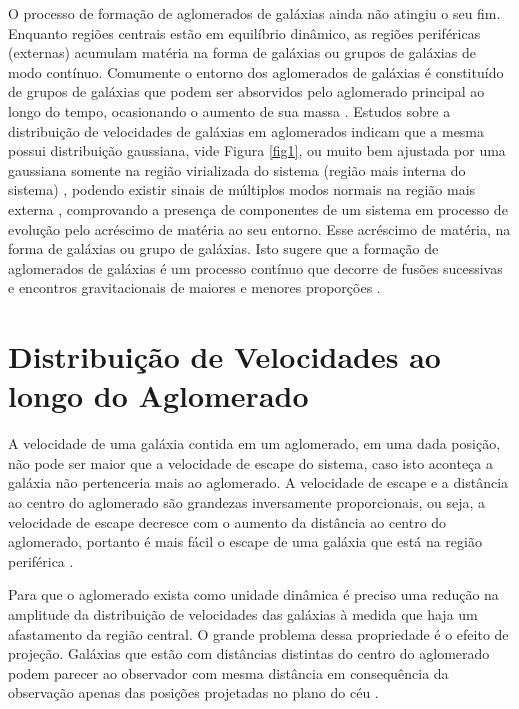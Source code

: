 O processo de formação de aglomerados de galáxias ainda não atingiu o seu fim. Enquanto regiões centrais estão em equilíbrio dinâmico, as regiões periféricas (externas) acumulam matéria na forma de galáxias ou grupos de galáxias de modo contínuo. Comumente o entorno dos aglomerados de galáxias é constituído de grupos de galáxias que podem ser absorvidos pelo aglomerado principal ao longo do tempo, ocasionando o aumento de sua massa \cite{rembold2011}. Estudos sobre a distribuição de velocidades de galáxias em aglomerados indicam que a mesma possui distribuição gaussiana, vide Figura \ref{fig1}, ou muito bem ajustada por uma gaussiana somente na região virializada do sistema (região mais interna do sistema) \cite{yahil1977velocity}, podendo existir sinais de múltiplos modos normais na região mais externa \cite{ribeiro2011non}, comprovando a presença de componentes de um sistema em processo de evolução pelo acréscimo de matéria ao seu entorno. Esse acréscimo de matéria, na forma de galáxias ou grupo de galáxias.  Isto sugere que a formação de aglomerados de galáxias é um processo contínuo que decorre de fusões sucessivas e encontros gravitacionais de maiores e menores proporções \cite{nascimento2016dynamical}.


\section{Distribuição de Velocidades ao longo do Aglomerado}
A velocidade de uma galáxia contida em um aglomerado, em uma dada posição, não pode ser maior que a velocidade de escape do sistema, caso isto aconteça a galáxia não pertenceria mais ao aglomerado. A velocidade de escape e a distância ao centro do aglomerado são grandezas inversamente proporcionais, ou seja, a velocidade de escape decresce com o aumento da distância ao centro do aglomerado, portanto é mais fácil o escape de uma galáxia que está na região periférica \cite{viegas2004}.

Para que o aglomerado exista como unidade dinâmica é preciso uma redução na amplitude da distribuição de velocidades das galáxias à medida que haja um afastamento da região central. O grande problema dessa propriedade é o efeito de projeção. Galáxias que estão com distâncias distintas do centro do aglomerado podem parecer ao observador com mesma distância em consequência da observação apenas das posições projetadas no plano do céu \cite{viegas2004}.

